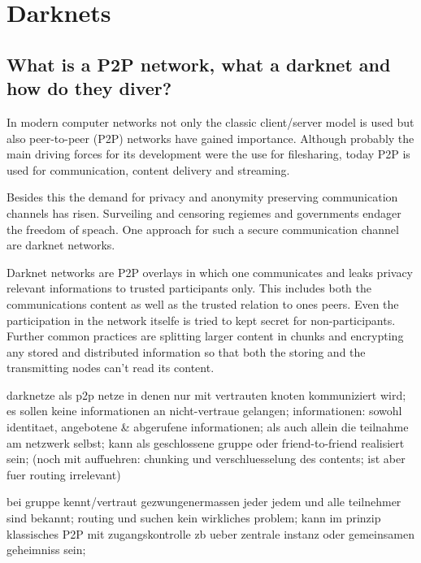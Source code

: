 \chapter{Darknets}

\section{What is a P2P network, what a darknet and how do they diver?}

In modern computer networks not only the classic client/server model is used but also peer-to-peer (P2P) networks have gained importance. Although probably the main driving forces for its development were the use for filesharing, today P2P is used for communication, content delivery and streaming.

Besides this the demand for privacy and anonymity preserving communication channels has risen. Surveiling and censoring regiemes and governments endager the freedom of speach. One approach for such a secure communication channel are darknet networks.

Darknet networks are P2P overlays in which one communicates and leaks privacy relevant informations to trusted participants only. This includes both the communications content as well as the trusted relation to ones peers. Even the participation in the network itselfe is tried to kept secret for non-participants. Further common practices are splitting larger content in chunks and encrypting any stored and distributed information so that both the storing and the transmitting nodes can't read its content.


darknetze als p2p netze in denen nur mit vertrauten knoten kommuniziert wird; es sollen keine informationen an nicht-vertraue gelangen; informationen: sowohl identitaet, angebotene & abgerufene informationen; als auch allein die teilnahme am netzwerk selbst; kann als geschlossene gruppe oder friend-to-friend realisiert sein; (noch mit auffuehren: chunking und verschluesselung des contents; ist aber fuer routing irrelevant)

bei gruppe kennt/vertraut gezwungenermassen jeder jedem und alle teilnehmer sind bekannt; routing und suchen kein wirkliches problem; kann im prinzip klassisches P2P mit zugangskontrolle zb ueber zentrale instanz oder gemeinsamen geheimniss sein;

